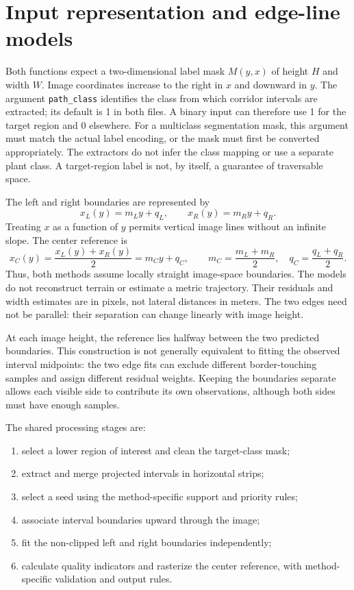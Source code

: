 \section{Input representation and edge-line models}
\label{sec:c4_input}

Both functions expect a two-dimensional label mask $M(y,x)$ of height $H$
and width $W$. Image coordinates increase to the right in $x$ and downward
in $y$. The argument \texttt{path\_class} identifies the class from which
corridor intervals are extracted; its default is 1 in both files. A
binary input can therefore use 1 for the target region and 0 elsewhere.
For a multiclass segmentation mask, this argument must match the actual
label encoding, or the mask must first be converted appropriately. The
extractors do not infer the class mapping or use a separate plant class.
A target-region label is not, by itself, a guarantee of traversable space.

The left and right boundaries are represented by
\begin{equation}
    x_L(y)=m_Ly+q_L, \qquad x_R(y)=m_Ry+q_R.
    \label{eq:c4_edges}
\end{equation}
Treating $x$ as a function of $y$ permits vertical image lines without an
infinite slope. The center reference is
\begin{equation}
    x_C(y)=\frac{x_L(y)+x_R(y)}{2}=m_Cy+q_C,
    \qquad m_C=\frac{m_L+m_R}{2},\quad q_C=\frac{q_L+q_R}{2}.
    \label{eq:c4_line}
\end{equation}
Thus, both methods assume locally straight image-space boundaries.
The models do not reconstruct terrain or estimate a metric trajectory.
Their residuals and width estimates are in pixels, not lateral distances
in meters. The two edges need not be parallel: their separation can
change linearly with image height.

At each image height, the reference lies halfway between the two
predicted boundaries. This construction is not generally equivalent to
fitting the observed interval midpoints: the two edge fits can exclude
different border-touching samples and assign different residual weights.
Keeping the boundaries separate allows each visible side to contribute
its own observations, although both sides must have enough samples.

The shared processing stages are:
\begin{enumerate}
    \item select a lower region of interest and clean the target-class mask;
    \item extract and merge projected intervals in horizontal strips;
    \item select a seed using the method-specific support and priority rules;
    \item associate interval boundaries upward through the image;
    \item fit the non-clipped left and right boundaries independently;
    \item calculate quality indicators and rasterize the center reference,
    with method-specific validation and output rules.
\end{enumerate}

